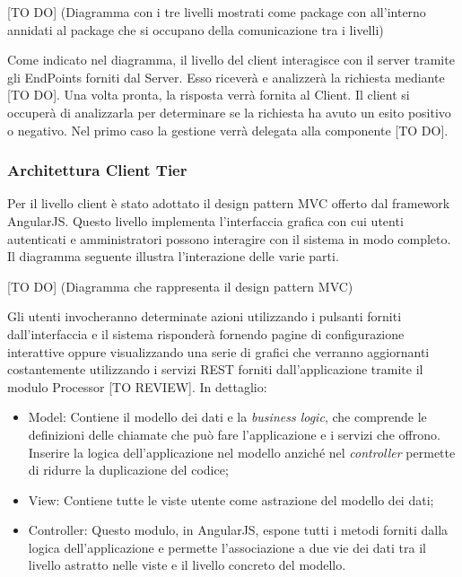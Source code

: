 		[TO DO] (Diagramma con i tre livelli mostrati come package con all'interno annidati al package che si occupano della comunicazione tra i livelli) \newline \newline
		
		Come indicato nel diagramma, il livello del client interagisce con il server tramite gli EndPoints forniti dal Server. Esso riceverà e analizzerà la richiesta mediante [TO DO]. Una volta pronta, la risposta verrà fornita al Client.\newline
		Il client si occuperà di analizzarla per determinare se la richiesta ha avuto un esito positivo o negativo. Nel primo caso la gestione verrà delegata alla componente [TO DO]. \newline



		\subsubsection{Architettura Client Tier}
		Per il livello client è stato adottato il design pattern MVC offerto dal framework AngularJS. Questo livello implementa l'interfaccia grafica con cui utenti autenticati e amministratori possono interagire con il sistema in modo completo. Il diagramma seguente illustra l'interazione delle varie parti. \newline \newline

		[TO DO] (Diagramma che rappresenta il design pattern MVC) \newline \newline

		Gli utenti invocheranno determinate azioni utilizzando i pulsanti forniti dall'interfaccia e il sistema risponderà fornendo pagine di configurazione interattive oppure visualizzando una serie di grafici che verranno aggiornanti costantemente utilizzando i servizi REST forniti dall'applicazione tramite il modulo Processor [TO REVIEW]. In dettaglio:

		\begin{itemize}
			\item Model: Contiene il modello dei dati e la \textit{business logic}, che comprende le definizioni delle chiamate che può fare l'applicazione e i servizi che offrono. Inserire la logica dell'applicazione nel modello anziché nel \textit{controller} permette di ridurre la duplicazione del codice;
			\item View: Contiene tutte le viste utente come astrazione del modello dei dati;
			\item Controller: Questo modulo, in AngularJS, espone tutti i metodi forniti dalla logica dell'applicazione e permette l'associazione a due vie dei dati tra il livello astratto nelle viste e il livello concreto del modello.
		\end{itemize}


